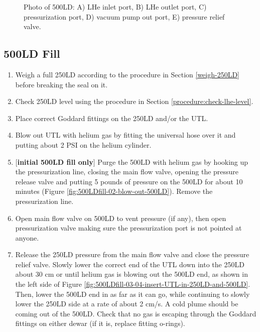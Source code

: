 \begin{figure}[!htbp]
\begin{minipage}{.50\textwidth}
 \caption{Photo of 500LD: A) LHe inlet port, B) LHe outlet port, C) pressurization port, D) vacuum pump out port, E) pressure relief valve.}
 \label{fig:500LD-photo}
 \end{minipage}
 \end{figure}

\pagebreak



\subsection{500LD Fill}
\label{practical-op:500LDfill}
\begin{enumerate}
 \item Weigh a full 250LD according to the procedure in Section \ref{weigh-250LD} before breaking the seal on it.
 \item Check 250LD level using the procedure in Section \ref{procedure:check-lhe-level}.
 \item Place correct Goddard fittings on the 250LD and/or the UTL.
 \item Blow out UTL with helium gas by fitting the universal hose over it and putting about 2 PSI on the helium cylinder. \label{procedure:500LDfill-blowoutUTL}
 \item $[$\textbf{initial 500LD fill only}$]$ Purge the 500LD with helium gas by hooking up the pressurization line, closing the main flow valve, opening the pressure release valve and putting 5 pounds of pressure on the 500LD for about 10 minutes (Figure \ref{fig:500LDfill-02-blow-out-500LD}).  Remove the pressurization line. \label{procedure:500LDfill-purge500LD}%
 \item Open main flow valve on 500LD to vent pressure (if any), then open pressurization valve making sure the pressurization port is not pointed at anyone.
 \item Release the 250LD pressure from the main flow valve and close the pressure relief valve.  Slowly lower the correct end of the UTL down into the 250LD about 30 cm or until helium gas is blowing out the 500LD end, as shown in the left side of Figure \ref{fig:500LDfill-03-04-insert-UTL-in-250LD-and-500LD}.  Then, lower the 500LD end in as far as it can go, while continuing to slowly lower the 250LD side at a rate of about 2 cm/s.  A cold plume should be coming out of the 500LD.  Check that no gas is escaping through the Goddard fittings on either dewar (if it is, replace fitting o-rings). \label{procedure:insert-UTL-in-250LD}

\end{enumerate}
